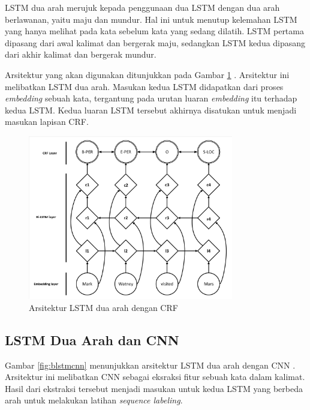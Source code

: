 LSTM dua arah merujuk kepada penggunaan dua LSTM dengan dua arah berlawanan, yaitu maju dan mundur. Hal ini untuk menutup kelemahan LSTM yang hanya melihat pada kata sebelum kata yang sedang dilatih. LSTM pertama dipasang dari awal kalimat dan bergerak maju, sedangkan LSTM kedua dipasang dari akhir kalimat dan bergerak mundur.

Arsitektur yang akan digunakan ditunjukkan pada Gambar \ref{fig:blstmcrf} \parencite{lample2016neural}. Arsitektur ini melibatkan LSTM dua arah. Masukan kedua LSTM didapatkan dari proses \textit{embedding} sebuah kata, tergantung pada urutan luaran \textit{embedding} itu terhadap kedua LSTM. Kedua luaran LSTM tersebut akhirnya disatukan untuk menjadi masukan lapisan CRF.

\begin{figure}[H]
	\centering
	\includegraphics[width=0.8\textwidth, trim=2 2 2 2, clip]{resources/3/blstmcrf.pdf}
	\caption{Arsitektur LSTM dua arah dengan CRF \parencite{lample2016neural}}
	\label{fig:blstmcrf}
\end{figure}

\subsection{LSTM Dua Arah dan CNN}

Gambar \ref{fig:blstmcnn} menunjukkan arsitektur LSTM dua arah dengan CNN \parencite{chiu2015named}. Arsitektur ini melibatkan CNN sebagai eksraksi fitur sebuah kata dalam kalimat. Hasil dari ekstraksi tersebut menjadi masukan untuk kedua LSTM yang berbeda arah untuk melakukan latihan \textit{sequence labeling}.

